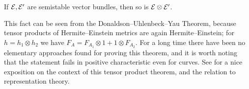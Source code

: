 \begin{theorem}
    If $\mathcal{E},\mathcal{E}'$ are semistable vector bundles, then so is
    $\mathcal{E}\otimes\mathcal{E}'$.
\end{theorem}

This fact can be seen from the Donaldson--Uhlenbeck--Yau Theorem, because tensor
products of Hermite--Einstein metrics are again Hermite--Einstein; for
$h=h_1\otimes h_2$ we have $F_A=F_{A_1}\otimes1+1\otimes F_{A_2}$. For a long
time there have been no elementary approaches found for proving this theorem,
and it is worth noting that the statement fails in positive characteristic even
for curves. See \cite{maculan_18} for a nice exposition on the context of this
tensor product theorem, and the relation to representation theory.
